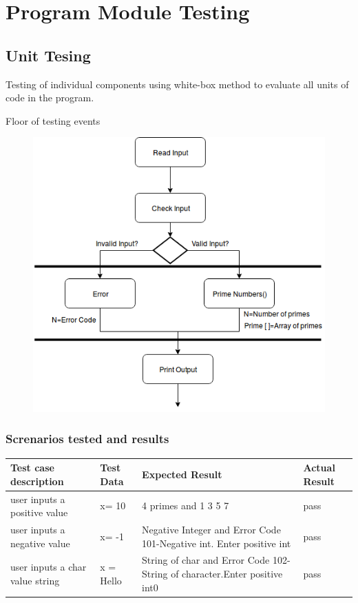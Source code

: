 \documentclass[11 pt]{article}
\begin{document}
\section{Program Module Testing}
\subsection{Unit Tesing}
Testing of individual components using white-box method to evaluate all units of code in the program.\\
\newpage

Floor of testing events
\begin{figure}[h]
    \centering
    
    \includegraphics[width=\linewidth]{Integration Testing.png}
    \end{figure}


\subsubsection{Screnarios tested and results}

\begin{tabular}{|p{4cm}|p{3cm}|p{4cm}|p{3cm}|}
\hline
\textbf{Test case description} &\textbf{Test Data} & \textbf{Expected Result} & \textbf{Actual Result}\\
\hline
 user inputs a positive value & x= 10 & 4 primes and 1 3 5 7 & pass\\
 \hline
user inputs a negative value  & x= -1 &  Negative Integer and  Error Code 101-Negative 	int. Enter positive int & pass \\
 \hline
user inputs a char value string & x = Hello &String of char and Error Code 102-String of     character.Enter positive int0
 & pass \\
 \hline
 \end{tabular}
\end{document}
